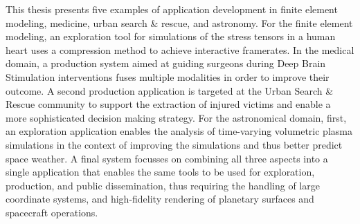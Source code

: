 This thesis presents five examples of application development in finite element modeling, medicine, urban search \& rescue, and astronomy.  For the finite element modeling, an exploration tool for simulations of the stress tensors in a human heart uses a compression method to achieve interactive framerates.  In the medical domain, a production system aimed at guiding surgeons during Deep Brain Stimulation interventions fuses multiple modalities in order to improve their outcome.  A second production application is targeted at the Urban Search \& Rescue community to support the extraction of injured victims and enable a more sophisticated decision making strategy.  For the astronomical domain, first, an exploration application enables the analysis of time-varying volumetric plasma simulations in the context of improving the simulations and thus better predict space weather.  A final system focusses on combining all three aspects into a single application that enables the same tools to be used for exploration, production, and public dissemination, thus requiring the handling of large coordinate systems, and high-fidelity rendering of planetary surfaces and spacecraft operations.
